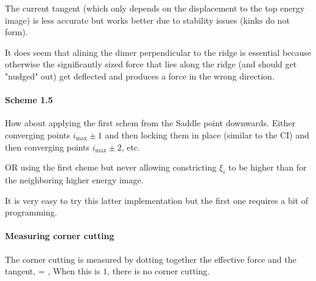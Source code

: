 The current tangent (which only depends on the displacement to the top energy image) is less accurate but works better due to stability issues (kinks do not form).

It does seem that alining the dimer perpendicular to the ridge is essential because otherwise the significantly sized force that lies along the ridge (and should get "nudged" out) get deflected and produces a force in the wrong direction.

\paragraph{Scheme 1.5}
How about applying the first schem from the Saddle point downwards.
Either converging points $i_\text{max} \pm 1$ and then locking them in place (similar to the CI) and then converging points $i_\text{max} \pm 2$, etc.

OR using the first cheme but never allowing constricting $\xi_i$ to be higher than for the neighboring higher energy image.

It is very easy to try this latter implementation but the first one requires a bit of programming.

\paragraph{Measuring corner cutting}
The corner cutting is measured by dotting together the effective force and the tangent,
 =  \cdot \uvt,
\eeq
When this is $1$, there is no corner cutting.

